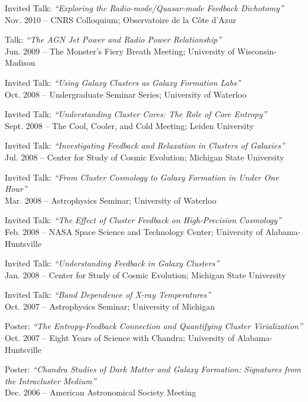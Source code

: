 \documentclass[12pt]{cv}
\begin{document}
\begin{llist}

{\sc Invited Talk: {\textit{``Exploring the Radio-mode/Quasar-mode Feedback Dichotomy''}}}\\
Nov. 2010 -- CNRS Colloquium; Observatoire de la C\^ote d'Azur

{\sc Talk: {\textit{``The AGN Jet Power and Radio Power Relationship''}}}\\
Jun. 2009 -- The Monster's Fiery Breath Meeting; University of Wisconsin-Madison

{\sc Invited Talk: {\textit{``Using Galaxy Clusters as Galaxy Formation Labs''}}}\\
Oct. 2008 -- Undergraduate Seminar Series; University of Waterloo

{\sc Invited Talk: {\textit{``Understanding Cluster Cores: The Role of Core Entropy''}}}\\
Sept. 2008 -- The Cool, Cooler, and Cold Meeting; Leiden University

{\sc Invited Talk: {\textit{``Investigating Feedback and Relaxation in Clusters of Galaxies''}}}\\
Jul. 2008 -- Center for Study of Cosmic Evolution; Michigan State University

{\sc Invited Talk: {\textit{``From Cluster Cosmology to Galaxy Formation in Under One Hour''}}}\\
Mar. 2008 -- Astrophysics Seminar; University of Waterloo

{\sc Invited Talk: {\textit{``The Effect of Cluster Feedback on High-Precision Cosmology''}}}\\
Feb. 2008 -- NASA Space Science and Technology Center; University of Alabama-Huntsville

{\sc Invited Talk: {\textit{``Understanding Feedback in Galaxy Clusters''}}}\\
Jan. 2008 -- Center for Study of Cosmic Evolution; Michigan State University

{\sc Invited Talk: {\textit{``Band Dependence of X-ray Temperatures''}}}\\
Oct. 2007 -- Astrophysics Seminar; University of Michigan

{\sc Poster: {\textit{``The Entropy-Feedback Connection and Quantifying Cluster Virialization''}}}\\
Oct. 2007 -- Eight Years of Science with Chandra; University of Alabama-Huntsville

{\sc Poster: {\textit{``Chandra Studies of Dark Matter and Galaxy Formation: Signatures from the Intracluster Medium''}}}\\
Dec. 2006 -- American Astronomical Society Meeting


\end{llist}
\end{document}
